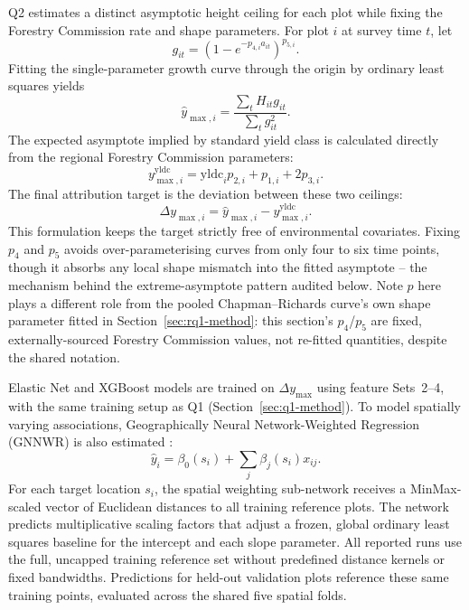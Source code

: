 \documentclass[logo,msc,ai]{infthesis}           %
\begin{document}
Q2 estimates a distinct asymptotic height ceiling for each plot while fixing the Forestry Commission rate and shape parameters. For plot $i$ at survey time $t$, let
\begin{equation}
g_{it}=\left(1-e^{-p_{4,i}a_{it}}\right)^{p_{5,i}}.
\end{equation}
Fitting the single-parameter growth curve through the origin by ordinary least squares yields
\begin{equation}
\hat y_{\max,i}=\frac{\sum_t H_{it}g_{it}}{\sum_t g_{it}^2}.
\label{eq:plot-ymax-fit}
\end{equation}
The expected asymptote implied by standard yield class is calculated directly from the regional Forestry Commission parameters:
\begin{equation}
y_{\max,i}^{\mathrm{yldc}}=\mathrm{yldc}_i p_{2,i}+p_{1,i}+2p_{3,i}.
\end{equation}
The final attribution target is the deviation between these two ceilings:
\begin{equation}
\Delta y_{\max,i}=\hat y_{\max,i}-y_{\max,i}^{\mathrm{yldc}}.
\label{eq:local-ymax-diff}
\end{equation}
This formulation keeps the target strictly free of environmental covariates. Fixing $p_4$ and $p_5$ avoids over-parameterising curves from only four to six time points, though it absorbs any local shape mismatch into the fitted asymptote -- the mechanism behind the extreme-asymptote pattern audited below. Note $p$ here plays a different role from the pooled Chapman--Richards curve's own shape parameter fitted in Section~\ref{sec:rq1-method}: this section's $p_4$/$p_5$ are fixed, externally-sourced Forestry Commission values, not re-fitted quantities, despite the shared notation.

Elastic Net and XGBoost models are trained on $\Delta y_{\max}$ using feature Sets~2--4, with the same training setup as Q1 (Section~\ref{sec:q1-method}). To model spatially varying associations, Geographically Neural Network-Weighted Regression (GNNWR) is also estimated \cite{du2020Geographically_C6_GWR}:
\begin{equation}
\hat y_i=\beta_0(s_i)+\sum_j\beta_j(s_i)x_{ij}.
\label{eq:gnnwr}
\end{equation}
For each target location $s_i$, the spatial weighting sub-network receives a MinMax-scaled vector of Euclidean distances to all training reference plots. The network predicts multiplicative scaling factors that adjust a frozen, global ordinary least squares baseline for the intercept and each slope parameter. All reported runs use the full, uncapped training reference set without predefined distance kernels or fixed bandwidths. Predictions for held-out validation plots reference these same training points, evaluated across the shared five spatial folds.
\end{document}
